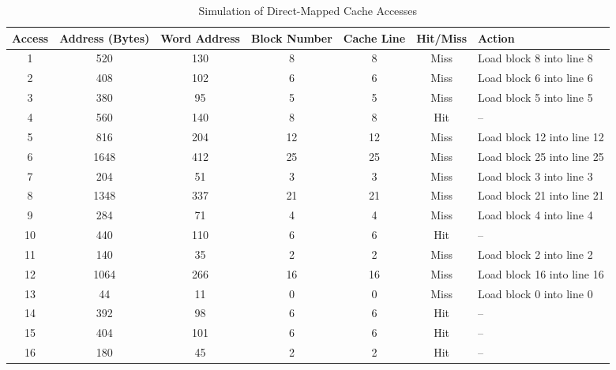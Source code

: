 	\begin{table}[h!]
		\begin{adjustwidth}{-2.4cm}{}
		\begin{tabular}{|c|c|c|c|c|c|l|}
			\hline
			\textbf{Access} & \textbf{Address (Bytes)} & \textbf{Word Address} & \textbf{Block Number} & \textbf{Cache Line} & \textbf{Hit/Miss} & \textbf{Action} \\ \hline
			1  & 520   & 130 & 8  & 8  & Miss & Load block 8 into line 8    \\ \hline
			2  & 408   & 102 & 6  & 6  & Miss & Load block 6 into line 6    \\ \hline
			3  & 380   & 95  & 5  & 5  & Miss & Load block 5 into line 5    \\ \hline
			4  & 560   & 140 & 8  & 8  & Hit  & --                          \\ \hline
			5  & 816   & 204 & 12 & 12 & Miss & Load block 12 into line 12  \\ \hline
			6  & 1648  & 412 & 25 & 25 & Miss & Load block 25 into line 25  \\ \hline
			7  & 204   & 51  & 3  & 3  & Miss & Load block 3 into line 3    \\ \hline
			8  & 1348  & 337 & 21 & 21 & Miss & Load block 21 into line 21  \\ \hline
			9  & 284   & 71  & 4  & 4  & Miss & Load block 4 into line 4    \\ \hline
			10 & 440   & 110 & 6  & 6  & Hit  & --                          \\ \hline
			11 & 140   & 35  & 2  & 2  & Miss & Load block 2 into line 2    \\ \hline
			12 & 1064  & 266 & 16 & 16 & Miss & Load block 16 into line 16  \\ \hline
			13 & 44    & 11  & 0  & 0  & Miss & Load block 0 into line 0    \\ \hline
			14 & 392   & 98  & 6  & 6  & Hit  & --                          \\ \hline
			15 & 404   & 101 & 6  & 6  & Hit  & --                          \\ \hline
			16 & 180   & 45  & 2  & 2  & Hit  & --                          \\ \hline
		\end{tabular}
		\caption{Simulation of Direct-Mapped Cache Accesses}
		\label{table:table-1}
		 \end{adjustwidth}
	\end{table}
	
